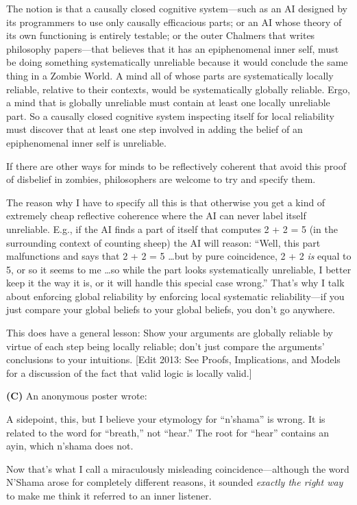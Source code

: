 {
 The notion is that a causally closed cognitive system---such as an
AI designed by its programmers to use only causally efficacious parts;
or an AI whose theory of its own functioning is entirely testable; or
the outer Chalmers that writes philosophy papers---that believes that
it has an epiphenomenal inner self, must be doing something
systematically unreliable because it would conclude the same thing in a
Zombie World. A mind all of whose parts are systematically locally
reliable, relative to their contexts, would be systematically globally
reliable. Ergo, a mind that is globally unreliable must contain at
least one locally unreliable part. So a causally closed cognitive
system inspecting itself for local reliability must discover that at
least one step involved in adding the belief of an epiphenomenal inner
self is unreliable.}

{
 If there are other ways for minds to be reflectively coherent that
avoid this proof of disbelief in zombies, philosophers are welcome to
try and specify them.}

{
 The reason why I have to specify all this is that otherwise you
get a kind of extremely cheap reflective coherence where the AI can
never label itself unreliable. E.g., if the AI finds a part of itself
that computes 2 + 2 = 5 (in the surrounding context of counting sheep)
the AI will reason: ``Well, this part malfunctions and
says that 2 + 2 = 5 \ldots but by pure coincidence, 2 + 2 \textit{is}
equal to 5, or so it seems to me \ldots so while the part looks
systematically unreliable, I better keep it the way it is, or it will
handle this special case wrong.''
That's why I talk about enforcing global reliability by
enforcing local systematic reliability---if you just compare your
global beliefs to your global beliefs, you don't go
anywhere.}

{
 This does have a general lesson: Show your arguments are globally
reliable by virtue of each step being locally reliable;
don't just compare the arguments'
conclusions to your intuitions. [Edit 2013: See Proofs, Implications,
and Models for a discussion of the fact that valid logic is locally
valid.]}

{
 \textbf{(C)} An anonymous poster wrote:}

{
 A sidepoint, this, but I believe your etymology for
``n'shama'' is
wrong. It is related to the word for
``breath,'' not
``hear.'' The root for
``hear'' contains an ayin, which
n'shama does not.}

{
 Now that's what I call a miraculously misleading
coincidence---although the word N'Shama arose for
completely different reasons, it sounded \textit{exactly the right way}
to make me think it referred to an inner listener.}

